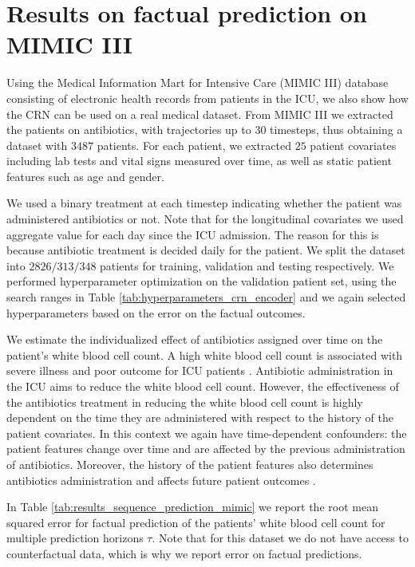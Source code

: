 \documentclass{article} %
\begin{document}
\newpage
\section{Results on factual prediction on MIMIC III} \label{apx:mimic}

	Using the Medical Information Mart for Intensive Care (MIMIC III) \citep{johnson2016mimic} database consisting of electronic health records from patients in the ICU, we also show how the CRN can be used on a real medical dataset. From MIMIC III we extracted the patients on antibiotics, with trajectories up to 30 timesteps, thus obtaining a dataset with $3487$ patients. For each patient, we extracted $25$ patient covariates including lab tests and vital signs measured over time, as well as static patient features such as age and gender.

    We used a binary treatment at each timestep indicating whether the patient was administered antibiotics or not. Note that for the longitudinal covariates we used aggregate value for each day since the ICU admission. The reason for this is because antibiotic treatment is decided daily for the patient. We split the dataset into $2826/313/348$ patients for training, validation and testing respectively. We performed hyperparameter optimization on the validation patient set, using the search ranges in Table \ref{tab:hyperparameters_crn_encoder} and we again selected hyperparameters based on the error on the factual outcomes. 
    
    We estimate the individualized effect of antibiotics assigned over time on the patient's white blood cell count. A high white blood cell count is associated with severe illness and poor outcome for ICU patients \citep{waheed2003white}. Antibiotic administration in the ICU aims to reduce the white blood cell count. However, the effectiveness of the antibiotics treatment in reducing the white blood cell count is highly dependent on the time they are administered with respect to the history of the patient covariates. In this context we again have time-dependent confounders: the patient features change over time and are affected by the previous administration of antibiotics. Moreover, the history of the patient features also determines antibiotics administration and affects future patient outcomes \citep{de2018complete, ali2019rational}.
    
    In Table \ref{tab:results_sequence_prediction_mimic} we report the root mean squared error for factual prediction of the patients' white blood cell count for multiple prediction horizons $\tau$. Note that for this dataset we do not have access to counterfactual data, which is why we report error on factual predictions.
\end{document}
